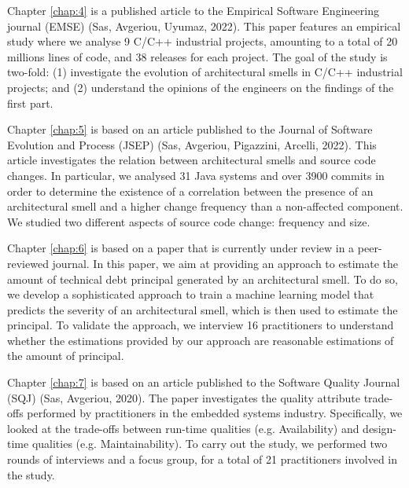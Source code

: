Chapter \ref{chap:4} is a published article to the Empirical Software Engineering journal (EMSE) (Sas, Avgeriou, Uyumaz, 2022).
This paper features an empirical study where we analyse 9 C/C++ industrial projects, amounting to a total of 20 millions lines of code, and 38 releases for each project.
The goal of the study is two-fold: (1) investigate the evolution of architectural smells in C/C++ industrial projects; and (2) understand the opinions of the engineers on the findings of the first part.

Chapter \ref{chap:5} is based on an article published to the Journal of Software Evolution and Process (JSEP) (Sas, Avgeriou, Pigazzini, Arcelli, 2022).
This article investigates the relation between architectural smells and source code changes.
In particular, we analysed 31 Java systems and over 3900 commits in order to determine the existence of a correlation between the presence of an architectural smell and a higher change frequency than a non-affected component. 
We studied two different aspects of source code change: frequency and size.

Chapter \ref{chap:6} is based on a paper that is currently under review in a peer-reviewed journal.
In this paper, we aim at providing an approach to estimate the amount of technical debt principal generated by an architectural smell.
To do so, we develop a sophisticated approach to train a machine learning model that predicts the severity of an architectural smell, which is then used to estimate the principal.
To validate the approach, we interview 16 practitioners to understand whether the estimations provided by our approach are reasonable estimations of the amount of principal.

Chapter \ref{chap:7} is based on an article published to the Software Quality Journal (SQJ) (Sas, Avgeriou, 2020).
The paper investigates the quality attribute trade-offs performed by practitioners in the embedded systems industry.
Specifically, we looked at the trade-offs between run-time qualities (e.g. Availability) and design-time qualities (e.g. Maintainability).
To carry out the study, we performed two rounds of interviews and a focus group, for a total of 21 practitioners involved in the study.









